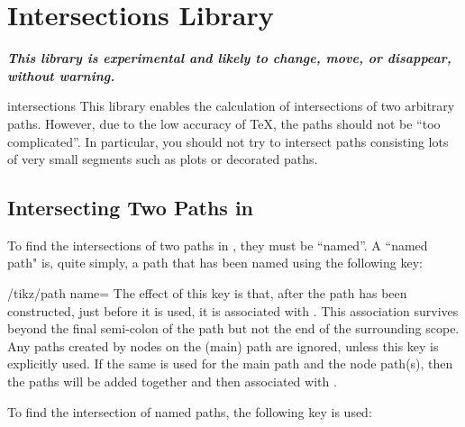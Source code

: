 %
%
%


\section{Intersections Library}

{\bf\emph{This library is experimental and likely to change,
move, or disappear, without warning.}}

\begin{pgflibrary}{intersections}
  This library enables the calculation of intersections of
  two arbitrary paths. However, due to the low accuracy of
  \TeX, the paths should not be ``too complicated''.
  In particular, you should not try to intersect paths consisting 
  lots of very small segments such as plots or decorated paths.
\end{pgflibrary}

\subsection{Intersecting Two Paths in \tikzname}

  To find the intersections of two paths in \tikzname, they must be
  ``named''. A ``named path" is, quite simply, a path that has been 
  named using the following key:
  
\begin{key}{/tikz/path name=}
	The effect of this key is that, after the path has been constructed, 
	just before it is used, it is associated with . This 
	association survives beyond the final semi-colon of the path 
	but not the end of the surrounding scope. Any paths created by
	nodes on the (main) path are ignored, unless this key is explicitly 
	used. If the same  is used for the main path and the
	node path(s), then the paths will be added together and then
	associated with .
	
\end{key}

  To find the intersection of named paths, the following key is used:

